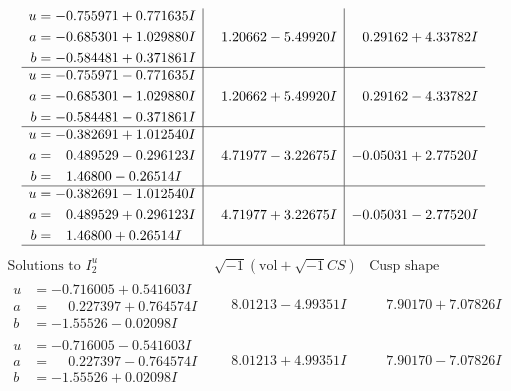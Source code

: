 \documentclass[1p]{elsarticle_modified}
\theoremstyle{definition}
\newcommand{\I}{\sqrt{-1}}
\begin{document}
$$\begin{array}{c|c|c}
\begin{aligned}
u &= -0.755971 + 0.771635 I \\
a &= -0.685301 + 1.029880 I \\
b &= -0.584481 + 0.371861 I\end{aligned}
 & \phantom{-}1.20662 - 5.49920 I & \phantom{-}0.29162 + 4.33782 I \\ \hline\begin{aligned}
u &= -0.755971 - 0.771635 I \\
a &= -0.685301 - 1.029880 I \\
b &= -0.584481 - 0.371861 I\end{aligned}
 & \phantom{-}1.20662 + 5.49920 I & \phantom{-}0.29162 - 4.33782 I \\ \hline\begin{aligned}
u &= -0.382691 + 1.012540 I \\
a &= \phantom{-}0.489529 - 0.296123 I \\
b &= \phantom{-}1.46800 - 0.26514 I\end{aligned}
 & \phantom{-}4.71977 - 3.22675 I & -0.05031 + 2.77520 I \\ \hline\begin{aligned}
u &= -0.382691 - 1.012540 I \\
a &= \phantom{-}0.489529 + 0.296123 I \\
b &= \phantom{-}1.46800 + 0.26514 I\end{aligned}
 & \phantom{-}4.71977 + 3.22675 I & -0.05031 - 2.77520 I\\
 \hline 
 \end{array}$$\newpage$$\begin{array}{c|c|c}  
\text{Solutions to }I^u_{2}& \I (\text{vol} + \sqrt{-1}CS) & \text{Cusp shape}\\
 \hline 
\begin{aligned}
u &= -0.716005 + 0.541603 I \\
a &= \phantom{-}0.227397 + 0.764574 I \\
b &= -1.55526 - 0.02098 I\end{aligned}
 & \phantom{-}8.01213 - 4.99351 I & \phantom{-}7.90170 + 7.07826 I \\ \hline\begin{aligned}
u &= -0.716005 - 0.541603 I \\
a &= \phantom{-}0.227397 - 0.764574 I \\
b &= -1.55526 + 0.02098 I\end{aligned}
 & \phantom{-}8.01213 + 4.99351 I & \phantom{-}7.90170 - 7.07826 I \\ \hline\begin{aligned}

\end{aligned}
\end{array}$$
\end{document}
